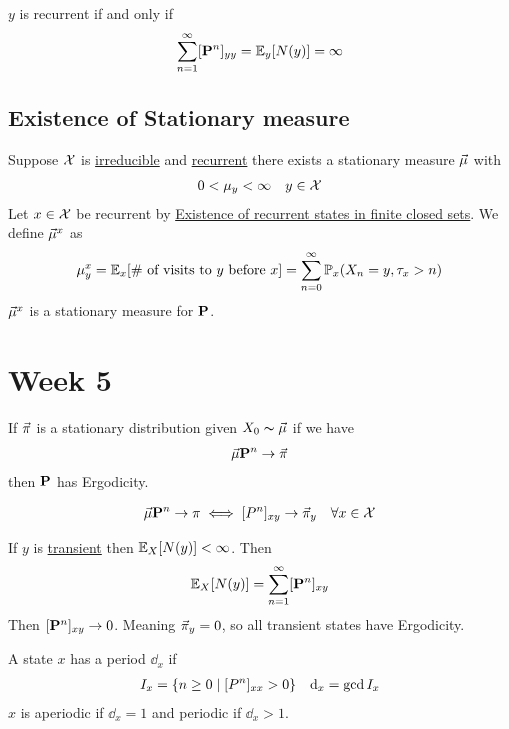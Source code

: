\documentclass[12pt,a4paper]{article}
\begin{document}
\begin{thm}
$y$ is recurrent if and only if 
\begin{align*}
\sum\limits_{n=1}^{\infty} [\vb P^n]_{yy} = \mathbb{E}_y[N(y)] = \infty
\end{align*}
\end{thm}
\subsection{Existence of Stationary measure}
\begin{thm}\label{thm411}
Suppose $\cal X$ is \hyperref[irreducible]{irreducible} and \hyperref[recurrent]{recurrent} there  exists a stationary measure $\va\mu$ with 
\begin{align*}
0<\mu_y < \infty && y\in \cal X
\end{align*}
Let $x\in \cal X$ be recurrent by \hyperref[finiteclosed]{Existence of recurrent states in finite closed sets}. We define $\va\mu^x$ as 
\begin{align*}
\mu_y^x = \mathbb{E}_x[\text{\# of visits to $y$ before $x$}] = \sum\limits_{n=0}^{\infty} \mathbb{P}_x(X_n = y, \tau_x > n)
\end{align*}
$\va\mu^x$ is a stationary measure for $\vb P$.
\end{thm}

\newpage
\section{Week 5}
\begin{defn}[Ergodicity]
If $\va\pi$ is a stationary distribution given $X_0 \thicksim \va\mu$  if we have 
\begin{align*}
\va\mu \vb P^n \rightarrow \va\pi
\end{align*}
then $\vb P$ has Ergodicity. 
\end{defn}
\begin{thm}
\begin{align*}
\va\mu \vb P^n \rightarrow \pi \iff [P^n]_{xy} \rightarrow \va\pi_y && \forall x\in \cal X
\end{align*}
\end{thm}
\begin{remark}
If $y$ is \hyperref[recurrent]{transient} then $\mathbb{E}_X[N(y)] < \infty$. Then 
\begin{align*}
\mathbb{E}_X[N(y)] = \sum\limits_{n=1}^{\infty} [\vb P^n]_{xy}
\end{align*}
Then $[\vb P^n]_{xy} \rightarrow 0$. Meaning $\va\pi_y = 0$, so all transient states have Ergodicity.
\end{remark}
\begin{defn}[Periodicity]
A state $x$ has a period $\dd_x$ if 
\begin{align*}
& I_x = \{n\geq 0 \;\vert\; [P^n]_{xx} > 0\}
&\dd_x = \gcd I_x 
\end{align*}
$x$ is {\color{deepred} aperiodic} if $\dd_x = 1$ and {\color{deepred} periodic} if $\dd_x > 1$.   
\end{defn}
\end{document}
